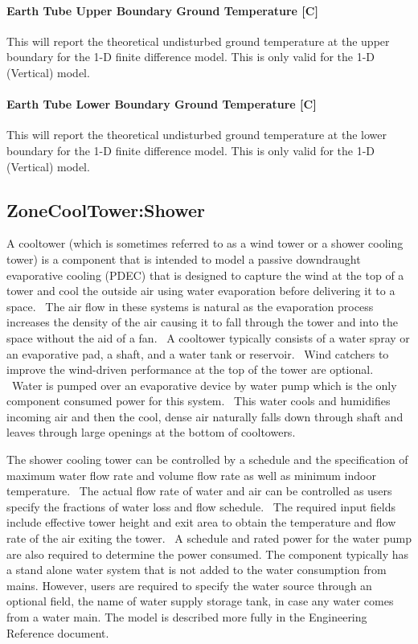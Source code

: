 \paragraph{Earth Tube Upper Boundary Ground Temperature {[}C{]}}\label{earth-tube-upper-boundary-temperature-c}

This will report the theoretical undisturbed ground temperature at the upper boundary for the 1-D finite difference model.  This is only valid for the 1-D (Vertical) model.

\paragraph{Earth Tube Lower Boundary Ground Temperature {[}C{]}}\label{earth-tube-lower-boundary-temperature-c}

This will report the theoretical undisturbed ground temperature at the lower boundary for the 1-D finite difference model.  This is only valid for the 1-D (Vertical) model.

\subsection{ZoneCoolTower:Shower}\label{zonecooltowershower}

A cooltower (which is sometimes referred to as a wind tower or a shower cooling tower) is a component that is intended to model a passive downdraught evaporative cooling (PDEC) that is designed to capture the wind at the top of a tower and cool the outside air using water evaporation before delivering it to a space.~ The air flow in these systems is natural as the evaporation process increases the density of the air causing it to fall through the tower and into the space without the aid of a fan. ~A cooltower typically consists of a water spray or an evaporative pad, a shaft, and a water tank or reservoir. ~Wind catchers to improve the wind-driven performance at the top of the tower are optional. ~Water is pumped over an evaporative device by water pump which is the only component consumed power for this system.~ This water cools and humidifies incoming air and then the cool, dense air naturally falls down through shaft and leaves through large openings at the bottom of cooltowers.

The shower cooling tower can be controlled by a schedule and the specification of maximum water flow rate and volume flow rate as well as minimum indoor temperature.~ The actual flow rate of water and air can be controlled as users specify the fractions of water loss and flow schedule.~ The required input fields include effective tower height and exit area to obtain the temperature and flow rate of the air exiting the tower.~ A schedule and rated power for the water pump are also required to determine the power consumed. The component typically has a stand alone water system that is not added to the water consumption from mains. However, users are required to specify the water source through an optional field, the name of water supply storage tank, in case any water comes from a water main. The model is described more fully in the Engineering Reference document.

